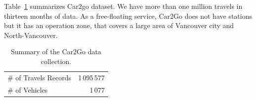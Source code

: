  Table~\ref{table:4_3_dataCar2Go} summarizes Car2go dataset. We have more than one million travels in thirteen months of data. As a free-floating service, Car2Go does not have stations but it has an operation zone, that covers a large area of Vancouver city and North-Vancouver. 

\begin{table}[htb]
	\centering
	\setlength{\tabcolsep}{2.3pt}
	\begin{tabular}{llr}
	\hline
	\multicolumn{2}{l}{\# of Travels Records} & 1\,095\,577\\
	\multicolumn{2}{l}{\# of Vehicles} & 1\,077
	\\\hline
	\end{tabular}
	\caption{Summary of the Car2Go data collection.}
	\label{table:4_3_dataCar2Go}
\end{table}